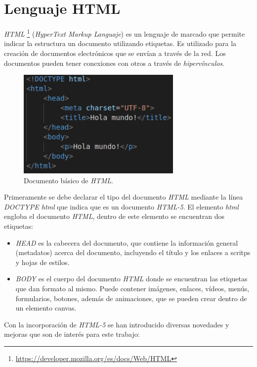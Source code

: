 \documentclass[a4paper, 12pt]{book}
\begin{document}
\section{Lenguaje HTML}

\textit{HTML} \footnote{\url{https://developer.mozilla.org/es/docs/Web/HTML}} (\textit{HyperText Markup Languaje}) es un lenguaje de marcado que permite indicar la estructura un documento utilizando etiquetas. Es utilizado para la creación de documentos electrónicos que se envían a través de la red. Los documentos pueden tener conexiones con otros a través de \textit{hipervínculos}.

\begin{figure}[H]
	\centering
    \includegraphics[width=8cm]{img/html}
    \caption{Documento básico de \textit{HTML}.}
    \label{figura:simulador_gazebo}
\end{figure}

Primeramente se debe declarar el tipo del documento \textit{HTML} mediante la línea \textit{DOCTYPE html} que indica que es un documento \textit{HTML-5}. El elemento \textit{html} engloba el documento \textit{HTML}, dentro de este elemento se encuentran dos etiquetas:

\begin{itemize}
	\item \textit{HEAD} es la cabecera del documento, que contiene la información general (metadatos) acerca del documento, incluyendo el título y los enlaces a scritps y hojas de estilos.
	
	\item \textit{BODY} es el cuerpo del documento \textit{HTML} donde se encuentran las etiquetas que dan formato al mismo. Puede contener imágenes, enlaces, vídeos, menús, formularios, botones, además de animaciones, que se pueden crear dentro de un elemento canvas.
\end{itemize}

Con la incorporación de \textit{HTML-5} se han introducido diversas novedades y mejoras que son de interés para este trabajo:
\end{document}
